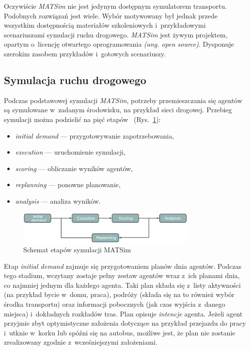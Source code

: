 \documentclass[twoside,12pt]{report}
\begin{document}
Oczywiście \textit{MATSim} nie jest jedynym dostępnym symulatorem transportu. Podobnych rozwiązań jest wiele. Wybór motywowany był jednak przede wszystkim dostępnością materiałów szkoleniowych i~przykładowymi scenariuszami symulacji ruchu drogowego. \textit{MATSim} jest żywym projektem, opartym o~licencję otwartego oprogramowania \textit{(ang. open source)}. Dysponuje szerokim zasobem przykładów i~gotowych scenariuszy. 

\subsection{Symulacja ruchu drogowego}\label{rozdz.symulacja}

Podczas podstawowej symulacji \textit{MATSim}, potrzeby przemieszczania się agentów są symulowane w~zadanym środowisku, na przykład sieci drogowej. Przebieg symulacji można podzielić na pięć etapów~\cite{matsim-userg} (Rys.~\ref{fig:schemat_symulacji}):

\begin{itemize}
\item \textit{initial demand} --- przygotowywanie zapotrzebowania,
\item \textit{execution} --- uruchomienie symulacji,
\item \textit{scoring} --- obliczanie wyników agentów,
\item \textit{replanning} --- ponowne planowanie,
\item \textit{analysis} --- analiza wyników.
\end{itemize}

\begin{figure}[htbp]
	\centering
	\includegraphics[width=0.8\textwidth]{img/simulation_stages}
	\caption{Schemat etapów symulacji MATSim}
	\label{fig:schemat_symulacji}
\end{figure}

Etap \textit{initial demand} zajmuje się przygotowaniem planów dnia agentów. Podczas tego stadium, wczytany zostaje pełny zestaw agentów wraz z~ich planami dnia, co najmniej jednym dla każdego agenta. Taki plan składa się z~listy aktywności (na przykład bycie w~domu, praca), podróży (składa się na to również wybór środka transportu) oraz informacji pobocznych (jak czas wyjścia z~danego miejsca) i~dokładnych rozkładów tras. Plan opisuje \textit{intencje} agenta. Jeżeli agent przyjmie zbyt optymistyczne założenia dotyczące na przykład przejazdu do pracy i~utknie w~korku lub spóźni się na autobus, możliwe jest, że plan nie zostanie zrealizowany zgodnie z~wcześniejszymi założeniami.
\end{document}
